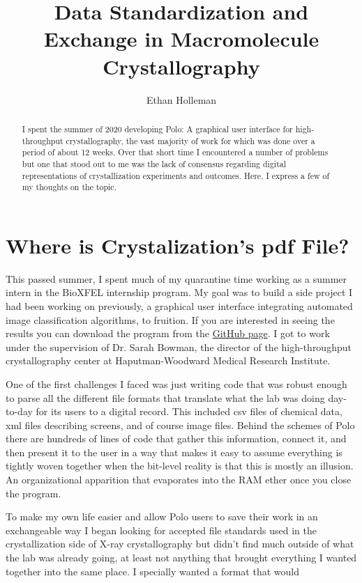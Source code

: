 \documentclass[]{article}
\title{Data Standardization and Exchange in Macromolecule Crystallography}
\author{Ethan Holleman}
\begin{document}
\maketitle

\begin{abstract}
	I spent the summer of 2020 developing Polo: A graphical user interface for high-throughput crystallography, the vast majority of work for which was done over a period of about 12 weeks. Over that short time I encountered a number of problems but one that stood out to me was the lack of consensus regarding digital representations of crystallization experiments and outcomes. Here, I express a few of my thoughts on the topic.

\end{abstract}

\section{Where is Crystalization's pdf File?}

This passed summer, I spent much of my quarantine time working as a summer intern in the BioXFEL internship program. My goal was to build a side project I had been working on previously, a graphical user interface integrating automated image classification algorithms, to fruition. If you are interested in seeing the results you can download the program from the \href{https://github.com/Hauptman-Woodward/Marco_Polo}{GitHub page}. I got to work under the supervision of Dr. Sarah Bowman, the director of the high-throughput crystallography center at Haputman-Woodward Medical Research Institute. 

One of the first challenges I faced was just writing code that was robust enough to parse all the different file formats that translate what the lab was doing day-to-day for its users to a digital record. This included csv files of chemical data, xml files describing screens, and of course image files. Behind the schemes of Polo there are hundreds of lines of code that gather this information, connect it, and then present it to the user in a way that makes it easy to assume everything is tightly woven together when the bit-level reality is that this is mostly an illusion. An organizational apparition that evaporates into the RAM ether once you close the program. 

To make my own life easier and allow Polo users to save their work in an exchangeable way I began looking for accepted file standards used in the crystallization side of X-ray crystallography but didn't find much outside of what the lab was already going, at least not anything that brought everything I wanted together into the same place. I specially wanted a format that would 
\end{document}
